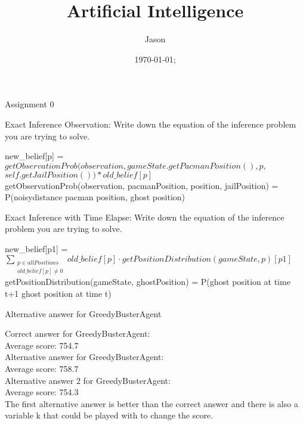 \documentclass[12pt]{article}
\newenvironment{Question}[2][Question]{\begin{trivlist}
\item[\hskip \labelsep {\bfseries #1}\hskip \labelsep {\bfseries #2.}]}{\end{trivlist}}
\begin{document}
\title{Artificial Intelligence}
\author{Jason}
\date{\today; \currenttime}
\maketitle

\begin{center}\begin{LARGE} Assignment 0 \end{LARGE}\end{center}

\begin{Question}{1}
 Exact Inference Observation: Write down the equation of the inference problem you are trying to solve.
\end{Question}
new\_belief[p] = $getObservationProb(observation, gameState.getPacmanPosition(), p, $\\
$self.getJailPosition()) * old\_belief[p]$\\
getObservationProb(observation, pacmanPosition, position, jailPosition) = \\ P(noisydistance \textbar pacman position, ghost position)
\begin{Question}{2}
 Exact Inference with Time Elapse: Write down the equation of the inference problem you are trying to solve.
\end{Question}
new\_belief[p1] = $\sum_{\substack{p \in allPositions \\ old\_belief[p] \neq 0}} old\_belief[p] \cdot getPositionDistribution(gameState, p)[p1]$\\
getPositionDistribution(gameState, ghostPosition) = P(ghost position at time t+1 \textbar ghost position at time t)
\begin{Question}{3}
 Alternative answer for GreedyBusterAgent
\end{Question}
Correct answer for GreedyBusterAgent: \\
Average score: 754.7\\
Alternative answer for GreedyBusterAgent: \\
Average score: 758.7\\
Alternative answer 2 for GreedyBusterAgent: \\
Average score: 754.3\\
The first alternative answer is better than the correct answer and there is also a variable k that could be played with to change the score.\\
\end{document}
